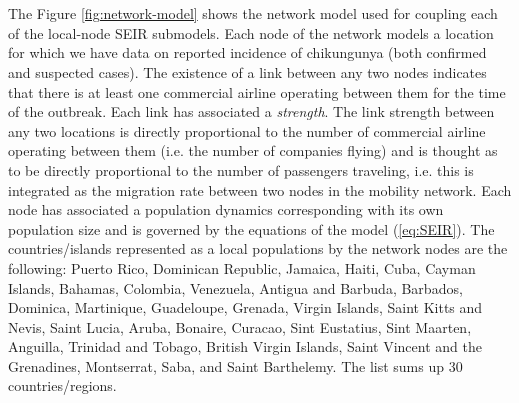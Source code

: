 \documentclass[10pt,a4paper]{article}
\begin{document}
\\\\
The Figure \ref{fig:network-model} shows the network model used for coupling each of the local-node SEIR submodels. Each node of the network models a location for which we have data on reported incidence of chikungunya (both confirmed and suspected cases).  The existence of a link between any two nodes indicates that there is at least one commercial airline operating between them for the time of the outbreak. 
%
Each link has associated a \textit{strength}. The link strength between any two locations is directly proportional to the number of commercial airline operating between them (i.e. the number of companies flying) and is thought as to be directly proportional to the number of passengers traveling, i.e. this is integrated as the migration rate between two nodes in the mobility network. Each node has associated a population dynamics corresponding with its own population size and is governed by the equations of the model (\ref{eq:SEIR}). 
%
The countries/islands represented as a local populations by the network nodes are the following: Puerto Rico, Dominican Republic, Jamaica, Haiti, Cuba, Cayman Islands, Bahamas, Colombia, Venezuela, Antigua and Barbuda, Barbados, Dominica, Martinique, Guadeloupe, Grenada, Virgin Islands, Saint Kitts and Nevis, Saint Lucia, Aruba, Bonaire, Curacao, Sint Eustatius, Sint Maarten, Anguilla, Trinidad and Tobago, British Virgin Islands, Saint Vincent and the Grenadines, Montserrat, Saba, and Saint Barthelemy. The list sums up 30 countries/regions.
\end{document}
